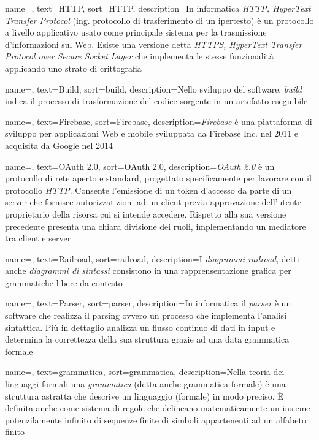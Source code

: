 {
	name=,
	text=HTTP,
	sort=HTTP,
	description={In informatica \emph{HTTP, HyperText Transfer Protocol} (ing. protocollo di trasferimento di un ipertesto) è un protocollo a livello applicativo usato come principale sistema per la trasmissione d'informazioni sul Web. Esiste una versione detta \emph{HTTPS, HyperText Transfer Protocol over Secure Socket Layer} che implementa le stesse funzionalità applicando uno strato di crittografia}
}

{
	name=,
	text=Build,
	sort=build,
	description={Nello sviluppo del software, \emph{build} indica il processo di trasformazione del codice sorgente in un artefatto eseguibile}
}

{
	name=,
	text=Firebase,
	sort=Firebase,
	description={\emph{Firebase} è una piattaforma di sviluppo per applicazioni Web e mobile sviluppata da Firebase Inc. nel 2011 e acquisita da Google nel 2014}
}

{
	name=,
	text=OAuth 2.0,
	sort=OAuth 2.0,
	description={\emph{OAuth 2.0} è un protocollo di rete aperto e standard, progettato specificamente per lavorare con il protocollo \emph{HTTP}. Consente l'emissione di un token d'accesso da parte di un server che fornisce autorizzatizioni ad un client previa approvazione dell'utente proprietario della risorsa cui si intende accedere. Rispetto alla sua versione precedente presenta una chiara divisione dei ruoli, implementando un mediatore tra client e server}
}

{
	name=,
	text=Railroad,
	sort=railroad,
	description={I \emph{diagrammi railroad}, detti anche \emph{diagrammi di sintassi} consistono in una rapprensentazione grafica per grammatiche libere da contesto}
}

{
	name=,
	text=Parser,
	sort=parser,
	description={In informatica il \emph{parser} è un software che realizza il parsing ovvero un processo che implementa l'analisi sintattica. Più in dettaglio analizza un flusso continuo di dati in input e determina la correttezza della sua struttura grazie ad una data grammatica formale}
}

{
	name=,
	text=grammatica,
	sort=grammatica,
	description={Nella teoria dei linguaggi formali una \emph{grammatica} (detta anche grammatica formale) è una struttura astratta che descrive un linguaggio (formale) in modo preciso. È definita anche come sistema di regole che delineano matematicamente un insieme potenzilamente infinito di sequenze finite di simboli appartenenti ad un alfabeto finito}
}

